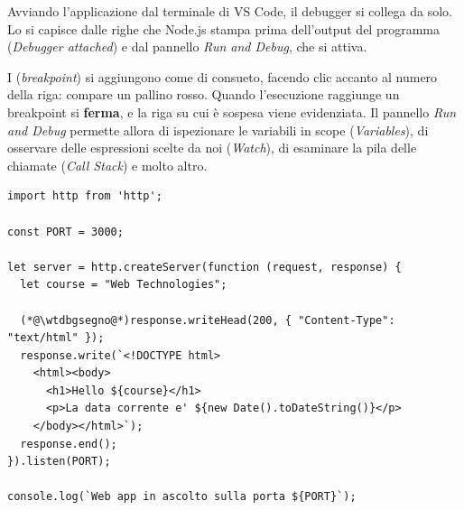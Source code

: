 Avviando l'applicazione dal terminale di VS Code, il debugger si collega da
solo. Lo si capisce dalle righe che Node.js stampa prima dell'output del
programma (\textit{Debugger attached}) e dal pannello \textit{Run and Debug},
che si attiva.


I  (\textit{breakpoint}) si aggiungono come di
consueto, facendo clic accanto al numero della riga: compare un pallino rosso.
Quando l'esecuzione raggiunge un breakpoint si \textbf{ferma}, e la riga su cui
è sospesa viene evidenziata. Il pannello \textit{Run and Debug} permette allora
di ispezionare le variabili in scope (\textit{Variables}), di osservare delle
espressioni scelte da noi (\textit{Watch}), di esaminare la pila delle chiamate
(\textit{Call Stack}) e molto altro.

\newcommand{\wtdbgsegno}{\tikz[remember picture, overlay]\coordinate (dbgriga);}
\newsavebox{\wtdbgeditor}
\begin{lrbox}{\wtdbgeditor}
\begin{minipage}{12.6cm}
\begin{lstlisting}[style=js, name=app.js, aboveskip=0pt, belowskip=0pt]
import http from 'http';

const PORT = 3000;

let server = http.createServer(function (request, response) {
  let course = "Web Technologies";

  (*@\wtdbgsegno@*)response.writeHead(200, { "Content-Type": "text/html" });
  response.write(`<!DOCTYPE html>
    <html><body>
      <h1>Hello ${course}</h1>
      <p>La data corrente e' ${new Date().toDateString()}</p>
    </body></html>`);
  response.end();
}).listen(PORT);

console.log(`Web app in ascolto sulla porta ${PORT}`);
\end{lstlisting}
\end{minipage}
\end{lrbox}


